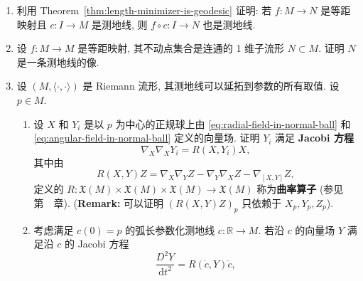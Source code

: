 \begin{RiemannExercise}
\begin{enumerate}[label=(\arabic*),ref=\arabic*,leftmargin=*]
\begin{enumerate}[label=(\alph*),leftmargin=*]
\[\]
由此推得 $i$ 是等距映射.
\item 设 $v\in\mathfrak{g}=T_eG$, $c_v$ 是满足 $c_v(0)=e$ 和 $\dot c_v(0)=v$ 的测地线. 证明若 $t$ 足够小, 则 $c_v(-t)=(c_v(t))^{-1}$. 由此推得 $c_v$ 在 $\mathbb{R}$ 上有定义, 且对所有 $t,s\in\mathbb{R}$ 满足 $c_v(t+s)=c_v(t)c_v(s)$.
{\small (\textbf{提示:} 回顾全正规邻域中的任意两点由该邻域内唯一一条测地线连接).}
\item {}\label{idx:bi-invariant-metric-geodesics}证明 $G$ 的测地线是左不变向量场的积分曲线, 并证明映射 $\exp$ (Lie 群的指数映射) 和 $\exp_e$ (单位元处的测地指数映射) 一致.
\item 设 $\nabla$ \label{idx:bi-invariant-metric-levi-civita}是双不变度量的 Levi-Civita 联络, $X,Y$ 是两个左不变向量场. 证明
\[
  \nabla_XY=\frac12[X,Y].
\]
\item 核实 Exercise~\ref{ex:riemannian-manifolds}(\ref{ex:left-invariant-metric}) 中的左不变度量实际上是双不变的.
\item 证明任意紧 Lie 群都容许双不变度量.
{\small (\textbf{提示:} 将一个左不变度量对所有右平移取平均).}
\end{enumerate}
\item\label{ex:isometries-send-geodesics-to-geodesics} 利用 Theorem~\ref{thm:length-minimizer-is-geodesic} 证明: 若 $f:M\to N$ 是等距映射且 $c:I\to M$ 是测地线, 则 $f\circ c:I\to N$ 也是测地线.
\item\label{ex:fixed-point-submanifold-of-isometry} 设 $f:M\to M$ 是等距映射, 其不动点集合是连通的 1 维子流形 $N\subset M$. 证明 $N$ 是一条测地线的像.
\item\label{ex:jacobi-fields-and-cut-locus} 设 $(M,\langle\cdot,\cdot\rangle)$ 是 Riemann 流形, 其测地线可以延拓到参数的所有取值. 设 $p\in M$.
\begin{enumerate}[label=(\alph*),leftmargin=*]
\item 设 $X$ 和 $Y_i$ 是以 $p$ 为中心的正规球上由 \eqref{eq:radial-field-in-normal-ball} 和 \eqref{eq:angular-field-in-normal-ball} 定义的向量场. 证明 $Y_i$ 满足 \textbf{Jacobi 方程}
\[
  \nabla_X\nabla_XY_i=R(X,Y_i)X,
\]
其中由
\[
  R(X,Y)Z=\nabla_X\nabla_YZ-\nabla_Y\nabla_XZ-\nabla_{[X,Y]}Z,
\]
定义的 $R:\mathfrak{X}(M)\times\mathfrak{X}(M)\times\mathfrak{X}(M)\to\mathfrak{X}(M)$ 称为\textbf{曲率算子} (参见第~~章).
{\small (\textbf{Remark:} 可以证明 $(R(X,Y)Z)_p$ 只依赖于 $X_p,Y_p,Z_p$).}
\item 考虑满足 $c(0)=p$ 的弧长参数化测地线 $c:\mathbb{R}\to M$. 若沿 $c$ 的向量场 $Y$ 满足沿 $c$ 的 Jacobi 方程
\[
  \frac{D^2Y}{\mathrm{d}t^2}=R(\dot c,Y)\dot c,
\]
\end{enumerate}
\end{enumerate}
\end{RiemannExercise}
